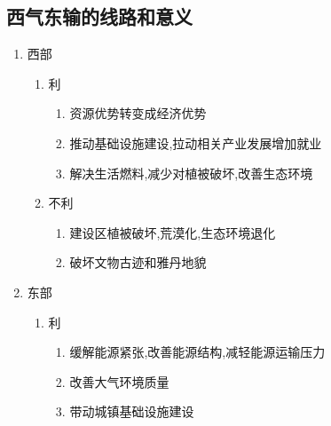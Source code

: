\documentclass[a4paper]{article}
\begin{document}
    \subsection{西气东输的线路和意义}
    \begin{enumerate}
        \item 西部
        \begin{enumerate}
            \item 利
            \begin{enumerate}
                \item 资源优势转变成经济优势
                \item 推动基础设施建设,拉动相关产业发展增加就业
                \item 解决生活燃料,减少对植被破坏,改善生态环境
            \end{enumerate}
            \item 不利
            \begin{enumerate}
                \item 建设区植被破坏,荒漠化,生态环境退化
                \item 破坏文物古迹和雅丹地貌
            \end{enumerate}
        \end{enumerate}
        \item 东部
        \begin{enumerate}
            \item 利
            \begin{enumerate}
                \item 缓解能源紧张,改善能源结构,减轻能源运输压力
                \item 改善大气环境质量
                \item 带动城镇基础设施建设
            \end{enumerate}
        \end{enumerate}
    \end{enumerate}
\end{document}

